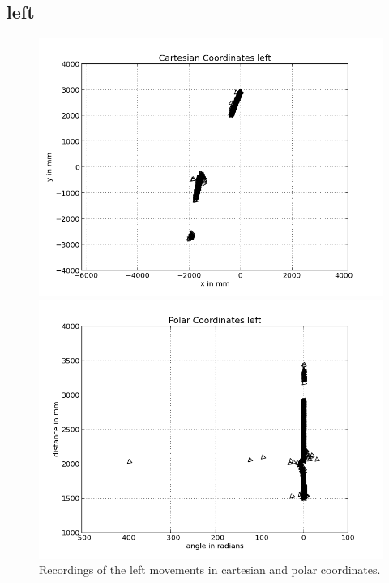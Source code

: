 \documentclass{scrartcl}
\begin{document}
\subsection{left}
\begin{figure}[H]
\centering
\begin{minipage}{.5\textwidth}
  \centering
  \includegraphics[width=.8\linewidth]{img/left.png}
\end{minipage}%
\begin{minipage}{.5\textwidth}
  \centering
  \includegraphics[width=.8\linewidth]{img/left_pc.png}
\end{minipage}
\caption{Recordings of the left movements in cartesian and polar coordinates.}
\label{fig:left}
\end{figure}
\end{document}
